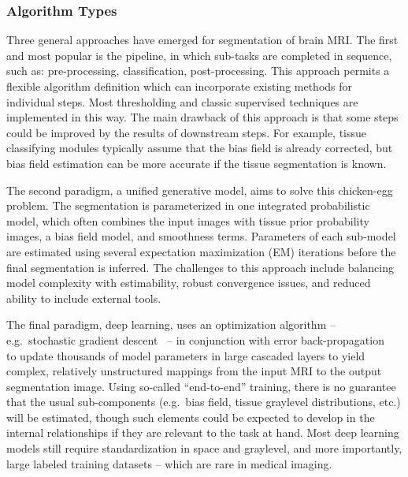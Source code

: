 \subsubsection{Algorithm Types}\label{sss:prior-models}
Three general approaches have emerged for segmentation of brain MRI.
The first and most popular is the pipeline,
in which sub-tasks are completed in sequence,
such as: pre-processing, classification, post-processing.
This approach permits a flexible algorithm definition
which can incorporate existing methods for individual steps.
Most thresholding and classic supervised techniques are implemented in this way.
The main drawback of this approach is that
some steps could be improved by the results of downstream steps.
For example, tissue classifying modules typically assume that the bias field is already corrected,
but bias field estimation can be more accurate if the tissue segmentation is known.
\par
The second paradigm, a unified generative model, aims to solve this chicken-egg problem.
The segmentation is parameterized in one integrated probabilistic model,
which often combines the input images with
tissue prior probability images, a bias field model, and smoothness terms.
Parameters of each sub-model are estimated using several expectation maximization (EM) iterations
before the final segmentation is inferred.
The challenges to this approach include
balancing model complexity with estimability,
robust convergence issues,
and reduced ability to include external tools.
\par
The final paradigm, deep learning,
uses an optimization algorithm -- e.g.\ stochastic gradient descent~\cite{Robbins1951} --
in conjunction with error back-propagation~\cite{Rumelhart1986}
to update thousands of model parameters in large cascaded layers to yield
complex, relatively unstructured mappings from the input MRI to the output segmentation image.
Using so-called ``end-to-end'' training, there is no guarantee that the usual sub-components
(e.g.\ bias field, tissue graylevel distributions, etc.) will be estimated,
though such elements could be expected to develop in the internal relationships
if they are relevant to the task at hand.
Most deep learning models still require standardization in space and graylevel,
and more importantly, large labeled training datasets -- which are rare in medical imaging.
